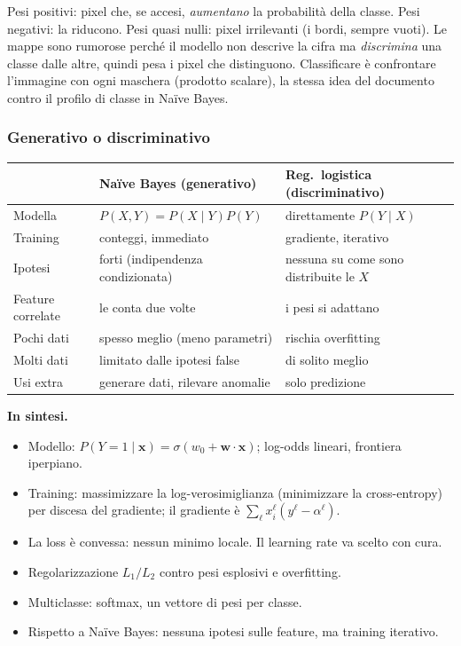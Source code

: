 \documentclass[12pt]{extarticle}
\begin{document}
\noindent Pesi positivi: pixel che, se accesi, \emph{aumentano} la probabilità della classe. Pesi negativi: la riducono. Pesi quasi nulli: pixel irrilevanti (i bordi, sempre vuoti). Le mappe sono rumorose perché il modello non descrive la cifra ma \emph{discrimina} una classe dalle altre, quindi pesa i pixel che distinguono. Classificare è confrontare l'immagine con ogni maschera (prodotto scalare), la stessa idea del documento contro il profilo di classe in Naïve Bayes.

\subsubsection{Generativo o discriminativo}

\begin{center}
\small
\begin{tabular}{p{2.7cm}p{5.6cm}p{5.6cm}}
    \toprule
    & \textbf{Naïve Bayes (generativo)} & \textbf{Reg.\ logistica (discriminativo)} \\
    \midrule
    Modella & $P(X,Y)=P(X\mid Y)P(Y)$ & direttamente $P(Y\mid X)$ \\
    Training & conteggi, immediato & gradiente, iterativo \\
    Ipotesi & forti (indipendenza condizionata) & nessuna su come sono distribuite le $X$ \\
    Feature correlate & le conta due volte & i pesi si adattano \\
    Pochi dati & spesso meglio (meno parametri) & rischia overfitting \\
    Molti dati & limitato dalle ipotesi false & di solito meglio \\
    Usi extra & generare dati, rilevare anomalie & solo predizione \\
    \bottomrule
\end{tabular}
\end{center}

\noindent\textbf{In sintesi.}
\begin{itemize}
    \item Modello: $P(Y{=}1\mid\mathbf{x})=\sigma(w_0+\mathbf{w}\cdot\mathbf{x})$; log-odds lineari, frontiera iperpiano.
    \item Training: massimizzare la log-verosimiglianza (minimizzare la cross-entropy) per discesa del gradiente; il gradiente è $\sum_\ell x_i^\ell(y^\ell-\alpha^\ell)$.
    \item La loss è convessa: nessun minimo locale. Il learning rate va scelto con cura.
    \item Regolarizzazione $L_1/L_2$ contro pesi esplosivi e overfitting.
    \item Multiclasse: softmax, un vettore di pesi per classe.
    \item Rispetto a Naïve Bayes: nessuna ipotesi sulle feature, ma training iterativo.
\end{itemize}
\end{document}

